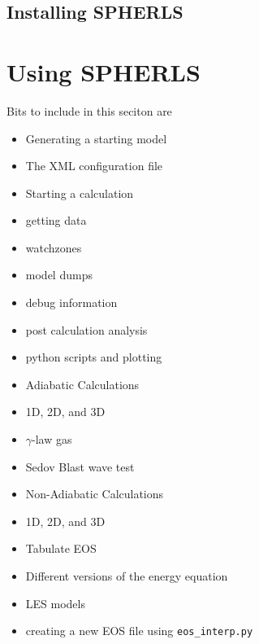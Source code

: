 \documentclass[11pt]{article}
\begin{document}
\subsection{Installing SPHERLS}
    
\section{Using SPHERLS}
Bits to include in this seciton are
\begin{itemize}
\item Generating a starting model
\item The XML configuration file
\item Starting a calculation
\item getting data
\item watchzones
\item model dumps
\item debug information
\item post calculation analysis
\item python scripts and plotting
\item Adiabatic Calculations
\item 1D, 2D, and 3D
\item $\gamma$-law gas
\item Sedov Blast wave test
\item Non-Adiabatic Calculations
\item 1D, 2D, and 3D
\item Tabulate EOS
\item Different versions of the energy equation
\item LES models
\item creating a new EOS file using {\tt eos\_interp.py}
\end{itemize}
\end{document}

